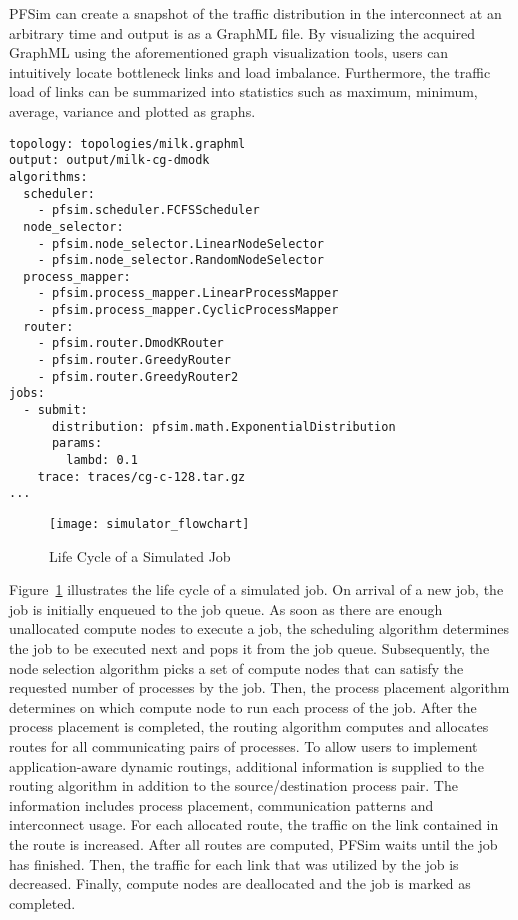 PFSim can create a snapshot of the traffic distribution in the
interconnect at an arbitrary time and output is as a GraphML file. By
visualizing the acquired GraphML using the aforementioned graph
visualization tools, users can intuitively locate bottleneck links and
load imbalance. Furthermore, the traffic load of links can be summarized
into statistics such as maximum, minimum, average, variance and plotted
as graphs.

\begin{lstlisting}[caption={Example of a Simulation Scenario}, label={lst:simulation-scenario}, linewidth={\columnwidth}, float={htbp}]
topology: topologies/milk.graphml
output: output/milk-cg-dmodk
algorithms:
  scheduler:
    - pfsim.scheduler.FCFSScheduler
  node_selector:
    - pfsim.node_selector.LinearNodeSelector
    - pfsim.node_selector.RandomNodeSelector
  process_mapper:
    - pfsim.process_mapper.LinearProcessMapper
    - pfsim.process_mapper.CyclicProcessMapper
  router:
    - pfsim.router.DmodKRouter
    - pfsim.router.GreedyRouter
    - pfsim.router.GreedyRouter2
jobs:
  - submit:
      distribution: pfsim.math.ExponentialDistribution
      params:
        lambd: 0.1
    trace: traces/cg-c-128.tar.gz
...
\end{lstlisting}

\begin{figure}
    \centering
    \texttt{[image: simulator\_flowchart]}
    \caption{Life Cycle of a Simulated Job}%
    \label{fig:simulator-flowchart}
\end{figure}

Figure~\ref{fig:simulator-flowchart} illustrates the life cycle of a
simulated job. On arrival of a new job, the job is initially enqueued to
the job queue. As soon as there are enough unallocated compute nodes
to execute a job, the scheduling algorithm determines the job to be
executed next and pops it from the job queue. Subsequently, the node
selection algorithm picks a set of compute nodes that can satisfy the
requested number of processes by the job. Then, the process placement
algorithm determines on which compute node to run each process of the
job. After the process placement is completed, the routing algorithm
computes and allocates routes for all communicating pairs of processes.
To allow users to implement application-aware dynamic routings,
additional information is supplied to the routing algorithm in addition
to the source/destination process pair. The information includes process
placement, communication patterns and interconnect usage. For each
allocated route, the traffic on the link contained in the route is
increased. After all routes are computed, PFSim waits until the job has
finished. Then, the traffic for each link that was utilized by the job
is decreased. Finally, compute nodes are deallocated and the job is
marked as completed.

